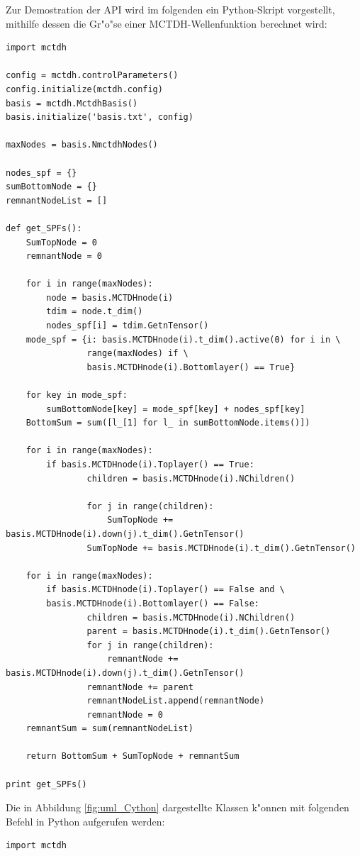 Zur Demostration der API wird im folgenden ein Python-Skript vorgestellt, mithilfe dessen die Gr"o"se einer MCTDH-Wellenfunktion berechnet wird:
\newpage
\begin{verbatim}
import mctdh

config = mctdh.controlParameters()
config.initialize(mctdh.config)
basis = mctdh.MctdhBasis()
basis.initialize('basis.txt', config)

maxNodes = basis.NmctdhNodes()

nodes_spf = {}
sumBottomNode = {}
remnantNodeList = []

def get_SPFs():
    SumTopNode = 0
    remnantNode = 0

    for i in range(maxNodes):
        node = basis.MCTDHnode(i)
        tdim = node.t_dim()
        nodes_spf[i] = tdim.GetnTensor() 
    mode_spf = {i: basis.MCTDHnode(i).t_dim().active(0) for i in \
                range(maxNodes) if \
                basis.MCTDHnode(i).Bottomlayer() == True}

    for key in mode_spf:
        sumBottomNode[key] = mode_spf[key] + nodes_spf[key]
    BottomSum = sum([l_[1] for l_ in sumBottomNode.items()])

    for i in range(maxNodes):
        if basis.MCTDHnode(i).Toplayer() == True:
                children = basis.MCTDHnode(i).NChildren()

                for j in range(children):
                    SumTopNode += basis.MCTDHnode(i).down(j).t_dim().GetnTensor()
                SumTopNode += basis.MCTDHnode(i).t_dim().GetnTensor()

    for i in range(maxNodes):
        if basis.MCTDHnode(i).Toplayer() == False and \
        basis.MCTDHnode(i).Bottomlayer() == False:
                children = basis.MCTDHnode(i).NChildren()
                parent = basis.MCTDHnode(i).t_dim().GetnTensor()
                for j in range(children):
                    remnantNode += basis.MCTDHnode(i).down(j).t_dim().GetnTensor() 
                remnantNode += parent
                remnantNodeList.append(remnantNode)
                remnantNode = 0
    remnantSum = sum(remnantNodeList)

    return BottomSum + SumTopNode + remnantSum

print get_SPFs()
\end{verbatim}


Die in Abbildung \ref{fig:uml_Cython} dargestellte Klassen k"onnen mit folgenden Befehl in Python aufgerufen werden:

\begin{verbatim}
import mctdh
\end{verbatim}

